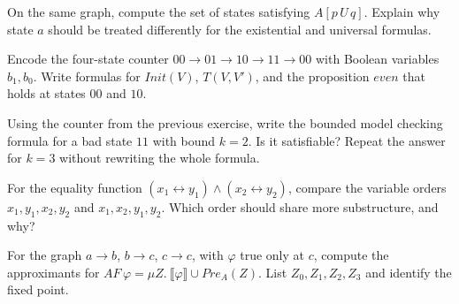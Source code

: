 \begin{chapex}
On the same graph, compute the set of states satisfying
$A[p\,U\,q]$.  Explain why state $a$ should be treated differently
for the existential and universal formulas.
\end{chapex}

\begin{chapex}
Encode the four-state counter
$00 \to 01 \to 10 \to 11 \to 00$
with Boolean variables $b_1,b_0$.  Write formulas for $Init(V)$,
$T(V,V')$, and the proposition $even$ that holds at states $00$ and
$10$.
\end{chapex}

\begin{chapex}
Using the counter from the previous exercise, write the bounded model
checking formula for a bad state $11$ with bound $k=2$.  Is it
satisfiable?  Repeat the answer for $k=3$ without rewriting the whole
formula.
\end{chapex}

\begin{chapex}
For the equality function
$(x_1 \leftrightarrow y_1) \land (x_2 \leftrightarrow y_2)$,
compare the variable orders $x_1,y_1,x_2,y_2$ and
$x_1,x_2,y_1,y_2$.  Which order should share more substructure, and
why?
\end{chapex}

\begin{chapex}
For the graph $a\to b$, $b\to c$, $c\to c$, with $\varphi$ true only
at $c$, compute the approximants for
$AF\,\varphi = \mu Z.\ \llbracket\varphi\rrbracket \cup Pre_A(Z)$.
List $Z_0,Z_1,Z_2,Z_3$ and identify the fixed point.
\end{chapex}
